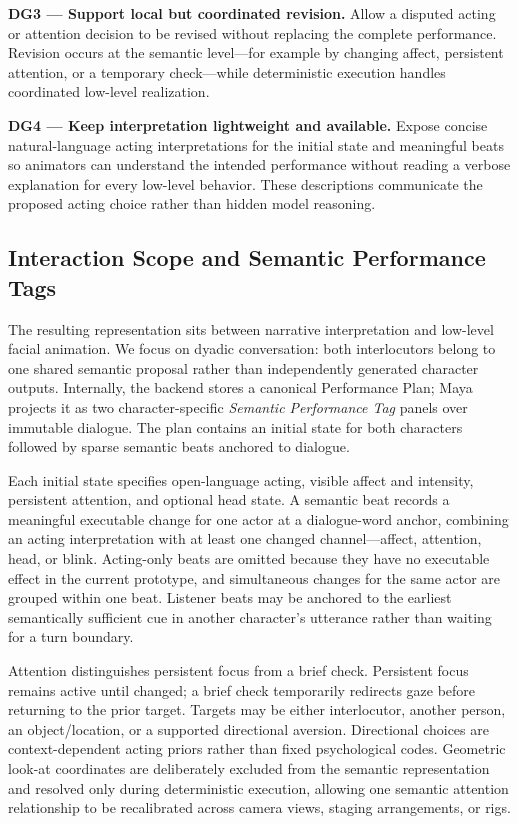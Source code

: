 \textbf{DG3 --- Support local but coordinated revision.}
Allow a disputed acting or attention decision to be revised without replacing the complete performance. Revision occurs at the semantic level---for example by changing affect, persistent attention, or a temporary check---while deterministic execution handles coordinated low-level realization.

\textbf{DG4 --- Keep interpretation lightweight and available.}
Expose concise natural-language acting interpretations for the initial state and meaningful beats so animators can understand the intended performance without reading a verbose explanation for every low-level behavior. These descriptions communicate the proposed acting choice rather than hidden model reasoning.

\subsection{Interaction Scope and Semantic Performance Tags}

The resulting representation sits between narrative interpretation and low-level facial animation. We focus on dyadic conversation: both interlocutors belong to one shared semantic proposal rather than independently generated character outputs. Internally, the backend stores a canonical Performance Plan; Maya projects it as two character-specific \textit{Semantic Performance Tag} panels over immutable dialogue. The plan contains an initial state for both characters followed by sparse semantic beats anchored to dialogue.

Each initial state specifies open-language acting, visible affect and intensity, persistent attention, and optional head state. A semantic beat records a meaningful executable change for one actor at a dialogue-word anchor, combining an acting interpretation with at least one changed channel---affect, attention, head, or blink. Acting-only beats are omitted because they have no executable effect in the current prototype, and simultaneous changes for the same actor are grouped within one beat. Listener beats may be anchored to the earliest semantically sufficient cue in another character's utterance rather than waiting for a turn boundary.

Attention distinguishes persistent focus from a brief check. Persistent focus remains active until changed; a brief check temporarily redirects gaze before returning to the prior target. Targets may be either interlocutor, another person, an object/location, or a supported directional aversion. Directional choices are context-dependent acting priors rather than fixed psychological codes. Geometric look-at coordinates are deliberately excluded from the semantic representation and resolved only during deterministic execution, allowing one semantic attention relationship to be recalibrated across camera views, staging arrangements, or rigs.

